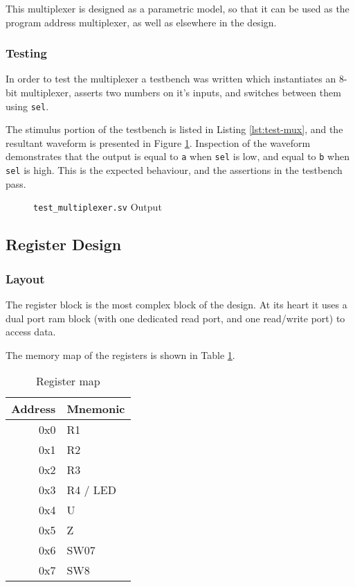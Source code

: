 This multiplexer is designed as a parametric model, so that it can be used as the program address multiplexer, as well as elsewhere in the design.


\subsubsection{Testing}
In order to test the multiplexer a testbench was written which instantiates an 8-bit multiplexer, asserts two numbers on it's inputs, and switches between them using \texttt{sel}.

The stimulus portion of the testbench is listed in Listing \ref{lst:test-mux}, and the resultant waveform is presented in Figure \ref{fig:test-mux}. Inspection of the waveform demonstrates that the output is equal to \texttt{a}  when \texttt{sel} is low, and equal to \texttt{b} when \texttt{sel} is high. This is the expected behaviour, and the assertions in the testbench pass.




\begin{figure}[ht]
	\centering
	
	\caption{\texttt{test\_multiplexer.sv} Output}
	\label{fig:test-mux}
\end{figure}

\subsection{Register Design}
\subsubsection{Layout}

The register block is the most complex block of the design. At its heart it uses a dual port \gls{ram} block (with one dedicated read port, and one read/write port) to access data.

The memory map of the registers is shown in Table \ref{tbl:reg-map}.

\begin{table}[ht]
	\centering
	\caption{Register map}
	\label{tbl:reg-map}
	\begin{tabular}{r | l}
		\toprule
		Address & Mnemonic \\
		\midrule
		0x0	& R1 \\
		0x1	& R2 \\
		0x2	& R3 \\
		0x3	& R4 / LED \\
		0x4	& U \\
		0x5	& Z \\
		0x6	& SW07 \\
		0x7	& SW8 \\
		\bottomrule
	\end{tabular}
\end{table}

